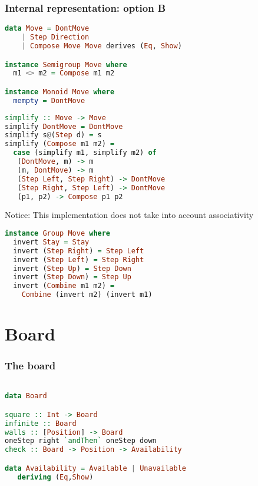 \documentclass[10pt]{beamer}
\begin{document}
\begin{frame}[fragile]
  \frametitle{Internal representation: option B}
\begin{lstlisting}[language=haskell, basicstyle=\ttfamily]
data Move = DontMove
    | Step Direction
    | Compose Move Move derives (Eq, Show)

instance Semigroup Move where
  m1 <> m2 = Compose m1 m2

instance Monoid Move where
  mempty = DontMove
\end{lstlisting}
\end{frame}
\begin{frame}[fragile]
\begin{lstlisting}[language=haskell, basicstyle=\ttfamily]
simplify :: Move -> Move
simplify DontMove = DontMove
simplify s@(Step d) = s
simplify (Compose m1 m2) =
  case (simplify m1, simplify m2) of
   (DontMove, m) -> m
   (m, DontMove) -> m
   (Step Left, Step Right) -> DontMove
   (Step Right, Step Left) -> DontMove
   (p1, p2) -> Compose p1 p2
\end{lstlisting}

  Notice:  This implementation does not take into account associativity
\end{frame}


\begin{frame}[fragile]
\begin{lstlisting}[language=haskell, basicstyle=\ttfamily]
instance Group Move where
  invert Stay = Stay
  invert (Step Right) = Step Left
  invert (Step Left) = Step Right
  invert (Step Up) = Step Down
  invert (Step Down) = Step Up
  invert (Combine m1 m2) =
    Combine (invert m2) (invert m1)
\end{lstlisting}
\end{frame}

\section{Board}

\begin{frame}[fragile]
  \frametitle{The board}
\begin{lstlisting}[language=haskell, basicstyle=\ttfamily]

data Board

square :: Int -> Board
infinite :: Board
walls :: [Position] -> Board
oneStep right `andThen` oneStep down
check :: Board -> Position -> Availability

data Availability = Available | Unavailable
   deriving (Eq,Show)
\end{lstlisting}
\end{frame}
\end{document}
